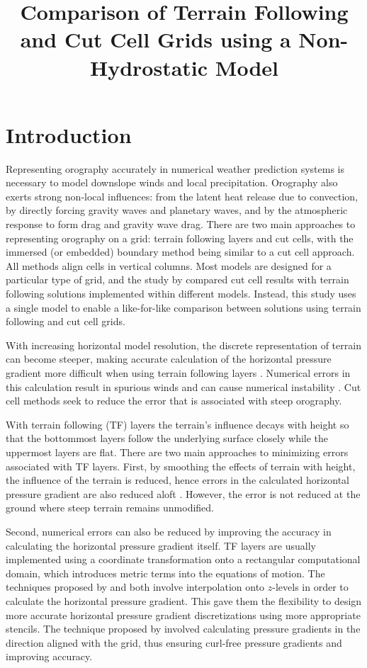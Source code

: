 \documentclass{ametsoc}
\title{Comparison of Terrain Following and Cut Cell Grids using a Non-Hydrostatic Model}
\affiliation{Department of Meteorology, University of Reading, Reading, United Kingdom}
\begin{document}
\maketitle

\section{Introduction}
Representing orography accurately in numerical weather prediction systems is necessary to model downslope winds and local precipitation.  Orography also exerts strong non-local influences: from the latent heat release due to convection, by directly forcing gravity waves and planetary waves, and by the atmospheric response to form drag and gravity wave drag.  There are two main approaches to representing orography on a grid: terrain following layers and cut cells, with the immersed (or embedded) boundary method \citep{simon2012} being similar to a cut cell approach.  All methods align cells in vertical columns.  Most models are designed for a particular type of grid, and the study by \citet{good2014} compared cut cell results with terrain following solutions implemented within different models.  Instead, this study uses a single model to enable a like-for-like comparison between solutions using terrain following and cut cell grids.

With increasing horizontal model resolution, the discrete representation of terrain can become steeper, making accurate calculation of the horizontal pressure gradient more difficult when using terrain following layers \citep{gary1973,steppeler2002}.  Numerical errors in this calculation result in spurious winds and can cause numerical instability \citep{fast2003,webster2003}.  Cut cell methods seek to reduce the error that is associated with steep orography.

With terrain following (TF) layers the terrain's influence decays with height so that the bottommost layers follow the underlying surface closely while the uppermost layers are flat.  There are two main approaches to minimizing errors associated with TF layers.  First, by smoothing the effects of terrain with height, the influence of the terrain is reduced, hence errors in the calculated horizontal pressure gradient are also reduced aloft \citep{schaer2002,leuenberger2010,klemp2011}.  However, the error is not reduced at the ground where steep terrain remains unmodified.

Second, numerical errors can also be reduced by improving the accuracy in calculating the horizontal pressure gradient itself.  TF layers are usually implemented using a coordinate transformation onto a rectangular computational domain, which introduces metric terms into the equations of motion.  The techniques proposed by \citet{klemp2011} and \cite{zaengl2012} both involve interpolation onto $z$-levels in order to calculate the horizontal pressure gradient.  This gave them the flexibility to design more accurate horizontal pressure gradient discretizations using more appropriate stencils.
The technique proposed by \citet{weller-shahrokhi2014} involved calculating pressure gradients in the direction aligned with the grid, thus ensuring curl-free pressure gradients and improving accuracy.
\end{document}
